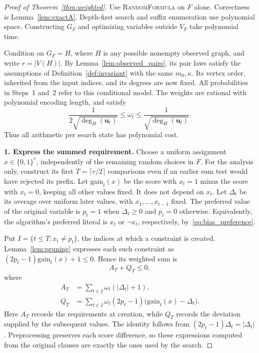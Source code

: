 \documentclass[11pt,a4paper]{article}
\theoremstyle{definition}
\theoremstyle{remark}
\newcommand{\bits}{\{0,1\}}
\begin{document}
\begin{proof}[Proof of Theorem~\ref{thm:weighted}]
Use \textnormal{\textsc{RandomFormula}} on $F$ alone.
Correctness is Lemma~\ref{lem:exactA}. Depth-first
search and suffix enumeration use polynomial space. Constructing $G_F$
and optimizing variables outside $V_F$ take polynomial time.

Condition on $G_F=H$, where $H$ is any possible nonempty observed graph,
and write $r=|V(H)|$. By Lemma~\ref{lem:observed_pairs}, its pair laws
satisfy the assumptions of Definition~\ref{def:invariant} with the same
$m_0,\kappa$. Its vertex order, inherited from the input indices, and its
degrees are now fixed. All probabilities in Steps~1 and~2 refer to this
conditional model. The weights are rational with polynomial encoding
length, and satisfy
\begin{equation}
 \frac{1}{2\sqrt{\deg_H(\mathbf u_t)}}\le\omega_t
 \le\frac{1}{\sqrt{\deg_H(\mathbf u_t)}}.
 \label{eq:random_weight_bounds}
\end{equation}
Thus all arithmetic per search state has polynomial cost.

\par\medskip\noindent\textbf{1. Express the summed requirement.}
Choose a uniform assignment $x\in\bits^r$, independently of the remaining
random choices in $F$. For the analysis only, construct its first $T=\lceil r/2\rceil$
comparisons even if an earlier sum test would have rejected its prefix.
Let $\mathrm{gain}_t(x)$ be the score with $x_t=1$ minus the score
with $x_t=0$, keeping all other values fixed. It does not depend on $x_t$.
Let $\Delta_t$ be its average over uniform later values, with
$x_1,\ldots,x_{t-1}$ fixed. The preferred value of the original variable
is $p_t=1$ when $\Delta_t\ge0$ and $p_t=0$ otherwise.
Equivalently, the algorithm's preferred literal is $x_t$ or $\neg x_t$,
respectively, by~\eqref{eq:bias_preference}.

Put $I=\{t\le T:x_t\ne p_t\}$, the indices at which a constraint is
created. Lemma~\ref{lem:pruning} expresses each such constraint as
$(2p_t-1)\mathrm{gain}_t(x)+1\le0$. Hence its weighted sum is
\begin{equation}
 A_T+Q_T\le0,
 \label{eq:random_sum}
\end{equation}
where
\begin{align*}
 A_T&=\sum_{t\in I}\omega_t(|\Delta_t|+1),\\
 Q_T&=\sum_{t\in I}\omega_t(2p_t-1)
                       \bigl(\mathrm{gain}_t(x)-\Delta_t\bigr).
\end{align*}
Here $A_T$ records the requirements at creation, while $Q_T$ records the
deviation supplied by the subsequent values. The identity follows from
$(2p_t-1)\Delta_t=|\Delta_t|$.
Preprocessing preserves each score difference, so these expressions
computed from the original clauses are exactly the ones used by the search.


\end{proof}
\end{document}
